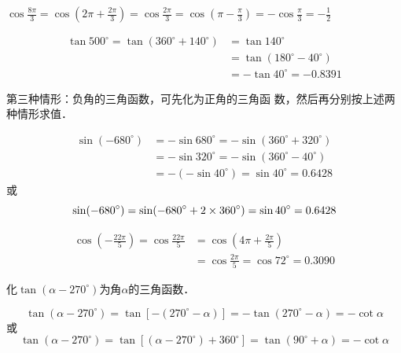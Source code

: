 \begin{example}
    $\cos\frac{8\pi}{3}=\cos\left(2\pi+\frac{2\pi}{3}\right)=\cos\frac{2\pi}{3}=\cos\left(\pi-\frac{\pi}{3}\right)=-\cos\frac{\pi}{3}=-\frac{1}{2}$
\end{example}

\begin{example}
\[\begin{split}
    \tan500^{\circ}=\tan(360^{\circ}+140^{\circ})&=\tan 140^{\circ}\\
    &=\tan(180^{\circ}-40^{\circ})\\ &=-\tan40^{\circ}=-0.8391
\end{split}\]
\end{example}

第三种情形：负角的三角函数，可先化为正角的三角函
数，然后再分别按上述两种情形求值．

\begin{example}
\[\begin{split}
    \sin( -680^{\circ}) &= -\sin680^{\circ} =-\sin(360^{\circ}+320^{\circ})\\
   &=-\sin320^{\circ}
   =-\sin(360^{\circ}-40^{\circ})\\
  & =-(-\sin40^{\circ})   =\sin40^{\circ}=0.6428
\end{split}\]
或$$\sin( -680^{\circ})=\sin( -680^{\circ}+2\times 360^{\circ})=\sin 40^{\circ}=0.6428$$
\end{example}

\begin{example}
    \[\begin{split}
        \cos\left(-\frac{22\pi}{5}\right)=\cos\frac{22\pi}{5}&=\cos\left(4\pi+\frac{2\pi}{5}\right)\\ &=\cos\frac{2\pi}{5}=\cos72^{\circ}=0.3090
    \end{split}\]
\end{example}    


\begin{example}
    化$\tan (\alpha-270^{\circ})$为角$\alpha$的三角函数．
\end{example}

\begin{solution}
$$\tan (\alpha-270^{\circ})=\tan [-(270^{\circ}-\alpha)]
=-\tan (270^{\circ}-\alpha)
=-\cot \alpha$$
或
$$\tan (\alpha-270^{\circ})=\tan[ (\alpha-270^{\circ})+360^{\circ}]
=\tan (90^{\circ}+\alpha)=-\cot \alpha$$
\end{solution}

